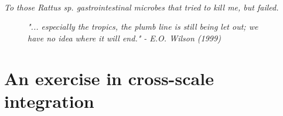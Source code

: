 \documentclass[b5paper,justified]{tufte-book} %
\begin{document}

\tableofcontents %






\cleardoublepage
~\vfill
\begin{doublespace}
\noindent\fontsize{18}{22}\selectfont\itshape
\nohyphenation
To those \textit{Rattus sp.} gastrointestinal microbes that tried to kill me, but failed.\\
\end{doublespace}
\vfill
\vfill



\begin{landscape}
\begin{figure}
\vspace*{-.6cm}\hspace*{4.4cm}
\label{fig:chap1}
\hspace*{5cm}\begin{minipage}{18cm} 
\footnotesize \textit{"... especially the tropics, the plumb line is still being let out; we have no idea where it will end." - E.O. Wilson (1999) \nocite{Wilson1999}}
\small 
\end{minipage}
\end{figure}
\end{landscape}

\cleardoublepage

\mainmatter %

\chapter{An exercise in cross-scale integration} %
\end{document}
